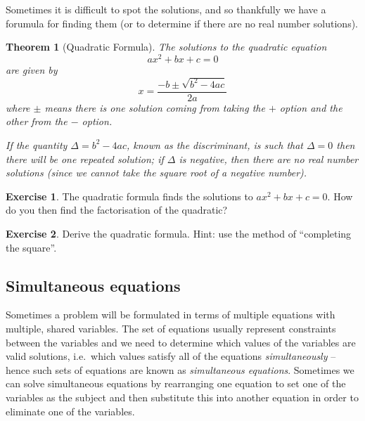 \documentclass[
]{book}
\newtheorem{theorem}{Theorem}[chapter]
\theoremstyle{definition}
\theoremstyle{definition}
\theoremstyle{definition}
\newtheorem{exercise}{Exercise}[chapter]
\theoremstyle{definition}
\theoremstyle{remark}
\begin{document}
Sometimes it is difficult to spot the solutions, and so thankfully we have a forumula for finding them (or to determine if there are no real number solutions).

\begin{theorem}[Quadratic Formula]
\protect\hypertarget{thm:quadform}{}\label{thm:quadform}The solutions to the quadratic equation
\[ax^2+bx+c=0\]
are given by
\[x=\frac{-b\pm\sqrt{b^2-4ac}}{2a}\]
where \(\pm\) means there is one solution coming from taking the \(+\) option and the other from the \(-\) option.

If the quantity \(\Delta = b^2-4ac\), known as the \emph{discriminant}, is such that \(\Delta = 0\) then there will be one repeated solution; if \(\Delta\) is negative, then there are no real number solutions (since we cannot take the square root of a negative number).
\end{theorem}

\begin{exercise}
\protect\hypertarget{exr:quadfact}{}\label{exr:quadfact}The quadratic formula finds the solutions to \(ax^2+bx+c=0\). How do you then find the factorisation of the quadratic?
\end{exercise}

\begin{exercise}
\protect\hypertarget{exr:quadform}{}\label{exr:quadform}Derive the quadratic formula. Hint: use the method of ``completing the square''.
\end{exercise}

\hypertarget{simultaneous-equations}{%
\subsection{Simultaneous equations}\label{simultaneous-equations}}

Sometimes a problem will be formulated in terms of multiple equations with multiple, shared variables. The set of equations usually represent constraints between the variables and we need to determine which values of the variables are valid solutions, i.e.~which values satisfy all of the equations \emph{simultaneously} -- hence such sets of equations are known as \emph{simultaneous equations}. Sometimes we can solve simultaneous equations by rearranging one equation to set one of the variables as the subject and then substitute this into another equation in order to eliminate one of the variables.
\end{document}
